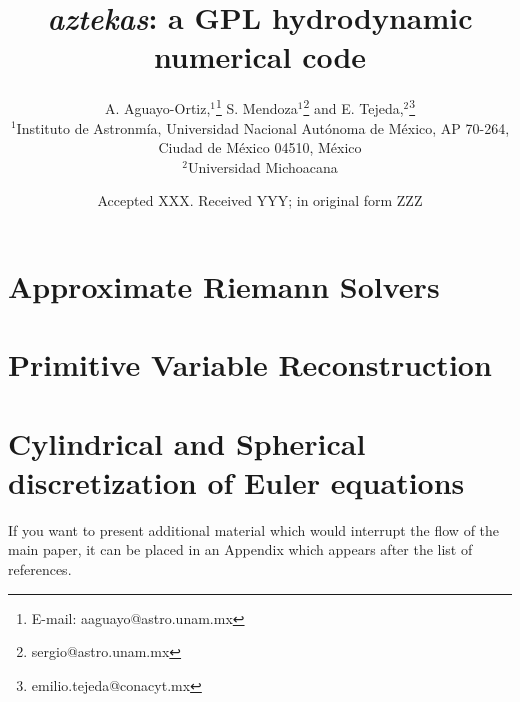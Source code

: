 \documentclass[usenatbib]{mnras}
\title[\textit{aztekas}-HD]{\textit{aztekas}: a GPL hydrodynamic numerical code}
\author[Aguayo-Ortiz, Mendoza \& Tejeda]{
A. Aguayo-Ortiz,$^{1}$\thanks{E-mail: aaguayo@astro.unam.mx}
S. Mendoza$^{1}$\thanks{sergio@astro.unam.mx} and
E. Tejeda,$^{2}$\thanks{emilio.tejeda@conacyt.mx}
\\
$^{1}$Instituto de Astronm\'ia, Universidad Nacional Aut\'onoma de M\'exico, AP 70-264, Ciudad de M\'exico 04510, M\'exico \\
$^{2}$Universidad Michoacana\\
}
\date{Accepted XXX. Received YYY; in original form ZZZ}
\begin{document}
\newcommand{\diff}{\mathrm{d}}
\maketitle










%









\appendix

\section{Approximate Riemann Solvers}
\label{A:hll}

\section{Primitive Variable Reconstruction}
\label{A:reconst}

\section{Cylindrical and Spherical discretization of Euler equations}
\label{A:cylsph}


If you want to present additional material which would interrupt the flow of the main paper,
it can be placed in an Appendix which appears after the list of references.



\bsp	%
\label{lastpage}
\end{document}
